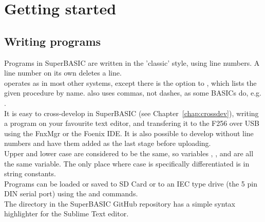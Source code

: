 \chapter{Getting started}

\section {Writing programs}
Programs in SuperBASIC are written in the 'classic' style, using line numbers. A line number on its own deletes a line.\\

 operates as in most other systems, except there is the option to , which lists the given procedure by name.  also uses commas, not dashes, as some BASICs do, e.g. .\\

It is easy to cross-develop in SuperBASIC (see Chapter~\ref{chap:crossdev}), writing a program on your favourite text editor, and transfering it to the F256 over USB using the FnxMgr or the Foenix IDE. It is also possible to develop without line numbers and have them added as the last stage before uploading.\\

Upper and lower case are considered to be the same, so variables , , and  are all the same variable. The only place where case is specifically differentiated is in string constants.\\

Programs can be loaded or saved to SD Card or to an IEC type drive (the 5 pin DIN serial port) using the  and  commands.\\

The  directory in the SuperBASIC GitHub repository has a simple syntax highlighter for the Sublime Text editor.\\
